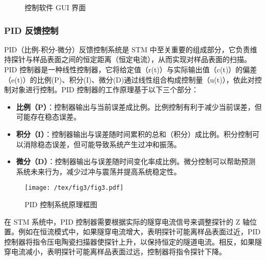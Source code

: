 \documentclass{article}
\begin{document}
\begin{spacing}{1.625}
\begin{figure}[!h]
			\caption{控制软件 GUI 界面}
			\label{fig19}
		\end{figure}
	
	
	
	\subsubsection{PID 反馈控制}		
		PID（比例-积分-微分）反馈控制系统是 STM 中至关重要的组成部分，它负责维持探针与样品表面之间的恒定距离（恒定电流），从而实现对样品表面的扫描。PID 控制器是一种线性控制器，它将给定值（r(t)）与实际输出值（c(t)）的偏差（e(t)）的比例(P)、积分(I)、微分(D)通过线性组合构成控制量（u(t)），依此对控制对象进行控制\cite{ref20}。PID 控制器的工作原理基于以下三个部分：
		\begin{itemize}
			\item \textbf{比例（P）}：控制器输出与当前误差成比例。比例控制有利于减少当前误差，但可能存在稳态误差。
			
			\item \textbf{积分（I）}：控制器输出与误差随时间累积的总和（积分）成比例。积分控制可以消除稳态误差，但可能导致系统产生过冲和振荡。
			
			\item \textbf{微分（D）}：控制器输出与误差随时间变化率成比例。微分控制可以帮助预测系统未来行为，减少过冲与震荡并提高系统稳定性。
		\end{itemize}
		
		\begin{figure}[!h]
			\centering
			\texttt{[image: /tex/fig3/fig3.pdf]}
			\caption{PID 控制系统原理框图}
		\end{figure}
		
		
		在 STM 系统中，PID 控制器需要根据实际的隧穿电流信号来调整探针的 Z 轴位置。例如在恒流模式中，如果隧穿电流增大，表明探针可能离样品表面过近，PID 控制器将指令压电陶瓷扫描器使探针上升，以保持恒定的隧道电流。相反，如果隧穿电流减小，表明探针可能离样品表面过远，控制器将指令探针下降。
		

\end{spacing}
\end{document}
